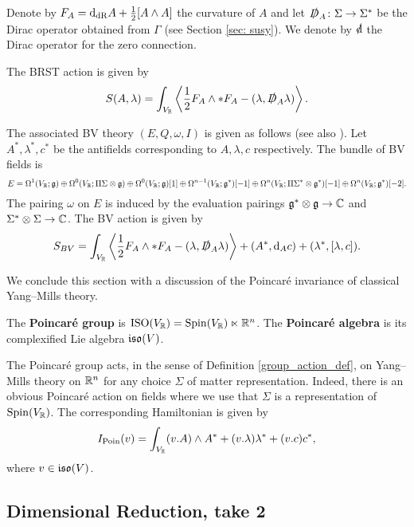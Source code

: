 \documentclass[10pt, oneside]{article}
\begin{document}
Denote by $F_A = {\rm d}_{\mathrm{dR}} A + \frac{1}{2}[A\wedge A]$ the curvature of $A$ and let $\slashed{D}_A \colon \Sigma \to \Sigma^*$ be the Dirac operator obtained from $\Gamma$ (see Section \ref{sec: susy}). We denote by $\sd\d$ the Dirac operator for the zero connection.

The BRST action is given by
\[S(A, \lambda) = \int_{V_\mathbb R} \left\langle \frac{1}{2} F_A \wedge \ast F_A - (\lambda, \slashed{D}_A \lambda)\right\rangle.\]

The associated BV theory $(E, Q, \omega, I)$ is given as follows (see also \cite[Section 3.1]{ElliottYoo1}). Let $A^*, \lambda^*, c^*$ be the antifields corresponding to $A, \lambda, c$ respectively. The bundle of BV fields is
\[E = \Omega^1(V_\mathbb R; \mathfrak g)\oplus \Omega^0(V_\mathbb R; \Pi\Sigma\otimes \mathfrak g)\oplus \Omega^0(V_\mathbb R; \mathfrak g)[1] \oplus \Omega^{n-1}(V_\mathbb R; \mathfrak g^*)[-1]\oplus \Omega^n(V_\mathbb R; \Pi\Sigma^*\otimes \mathfrak g^*)[-1]\oplus \Omega^n(V_\mathbb R; \mathfrak g^*)[-2].\]
The pairing $\omega$ on $E$ is induced by the evaluation pairings $\mathfrak{g}^*\otimes \mathfrak{g}\rightarrow \mathbb C$ and $\Sigma^*\otimes\Sigma\rightarrow\mathbb C$. The BV action is given by
\[S_{BV} = \int_{V_\mathbb R} \left\langle \frac{1}{2} F_A \wedge \ast F_A - (\lambda, \slashed{D}_A \lambda)\right\rangle + (A^*, {\rm d}_A c) + (\lambda^*, [\lambda, c]).\]

We conclude this section with a discussion of the Poincar\'e invariance of classical Yang--Mills theory.

\begin{definition}
The {\bf Poincar\'e group} is $\mathrm{ISO}(V_\mathbb R) = \mathrm{Spin}(V_\mathbb R) \ltimes \mathbb R^n$. The {\bf Poincar\'e algebra} is its complexified Lie algebra $\mathfrak{iso}(V)$.
\end{definition}

The Poincar\'e group acts, in the sense of Definition \ref{group_action_def}, on Yang--Mills theory on $\mathbb R^n$ for any choice $\Sigma$ of matter representation. Indeed, there is an obvious Poincar\'e action on fields where we use that $\Sigma$ is a representation of $\mathrm{Spin}(V_\mathbb R)$. The corresponding Hamiltonian is given by
\[
I_{\mathrm{Poin}}(v) = \int_{V_\mathbb R} (v.A) \wedge A^* + (v.\lambda) \lambda^* + (v.c)c^*,
\]
where $v\in\mathfrak{iso}(V)$.

\subsection{Dimensional Reduction, take 2}
\end{document}
